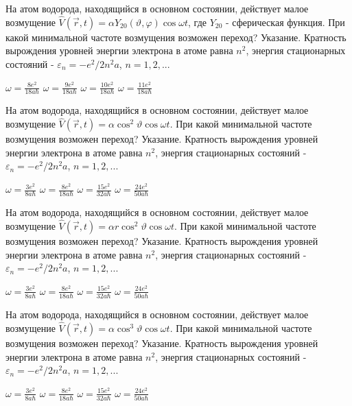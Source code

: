\documentclass[11pt,a4paper]{exam}
\begin{document}
\begin{questions}
\question На атом водорода, находящийся в основном состоянии, действует малое возмущение $\hat V(\vec r,t) = \alpha {Y_{20}}(\vartheta ,\varphi )\cos \omega t$, где ${Y_{20}}$ - сферическая функция. При какой минимальной частоте возмущения возможен переход? Указание. Кратность вырождения уровней энергии электрона в атоме равна ${n^2}$, энергия стационарных состояний - ${\varepsilon _n} =  - {e^2}/2{n^2}a$, $n = 1,2,...$
\begin{choices}
\choice $\omega  = \frac{{8{e^2}}}{{18a\hbar }}$     
\choice $\omega  = \frac{{9{e^2}}}{{18a\hbar }}$     
\choice $\omega  = \frac{{10{e^2}}}{{18a\hbar }}$    
\choice $\omega  = \frac{{11{e^2}}}{{18a\hbar }}$
\end{choices}

\question На атом водорода, находящийся в основном состоянии, действует малое возмущение $\hat V(\vec r,t) = \alpha {\cos ^2}\vartheta \cos \omega t$. При какой минимальной частоте возмущения возможен переход? Указание. Кратность вырождения уровней энергии электрона в атоме равна ${n^2}$, энергия стационарных состояний - ${\varepsilon _n} =  - {e^2}/2{n^2}a$, $n = 1,2,...$
\begin{choices}
\choice $\omega  = \frac{{3{e^2}}}{{8a\hbar }}$      
\choice $\omega  = \frac{{8{e^2}}}{{18a\hbar }}$     
\choice $\omega  = \frac{{15{e^2}}}{{32a\hbar }}$    
\choice $\omega  = \frac{{24{e^2}}}{{50a\hbar }}$
\end{choices}

\question На атом водорода, находящийся в основном состоянии, действует малое возмущение $\hat V(\vec r,t) = \alpha r{\cos ^2}\vartheta \cos \omega t$. При какой минимальной частоте возмущения возможен переход? Указание. Кратность вырождения уровней энергии электрона в атоме равна ${n^2}$, энергия стационарных состояний - ${\varepsilon _n} =  - {e^2}/2{n^2}a$, $n = 1,2,...$
\begin{choices}
\choice $\omega  = \frac{{3{e^2}}}{{8a\hbar }}$      
\choice $\omega  = \frac{{8{e^2}}}{{18a\hbar }}$     
\choice $\omega  = \frac{{15{e^2}}}{{32a\hbar }}$    
\choice $\omega  = \frac{{24{e^2}}}{{50a\hbar }}$
\end{choices}

\question На атом водорода, находящийся в основном состоянии, действует малое возмущение $\hat V(\vec r,t) = \alpha {\cos ^3}\vartheta \cos \omega t$. При какой минимальной частоте возмущения возможен переход? Указание. Кратность вырождения уровней энергии электрона в атоме равна ${n^2}$, энергия стационарных состояний - ${\varepsilon _n} =  - {e^2}/2{n^2}a$, $n = 1,2,...$
\begin{choices}
\choice $\omega  = \frac{{3{e^2}}}{{8a\hbar }}$      
\choice $\omega  = \frac{{8{e^2}}}{{18a\hbar }}$     
\choice $\omega  = \frac{{15{e^2}}}{{32a\hbar }}$    
\choice $\omega  = \frac{{24{e^2}}}{{50a\hbar }}$
\end{choices}


\end{questions}
\end{document}
